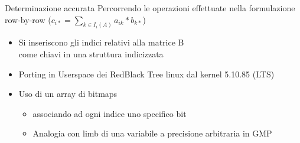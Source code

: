 \begin{frame} {Determinazione accurata}
Percorrendo le operazioni effettuate nella formulazione row-by-row	
($c_{i*} = \sum\limits_{k \in I_i(A)}  a_{ik} \ast  b_{k*}$)
\begin{itemize}
	\item	Si inseriscono gli indici relativi alla matrice B \\
	come chiavi in una struttura indicizzata
	\pause
	\item	Porting in Userspace dei RedBlack Tree linux dal kernel 5.10.85 (LTS)
	\pause
	\item	Uso di un array di bitmaps
	\begin{itemize}
		\item	associando ad ogni indice uno specifico bit
		\item	Analogia con limb di una variabile a precisione arbitraria in GMP
	\end{itemize}
\end{itemize}
\end{frame}

